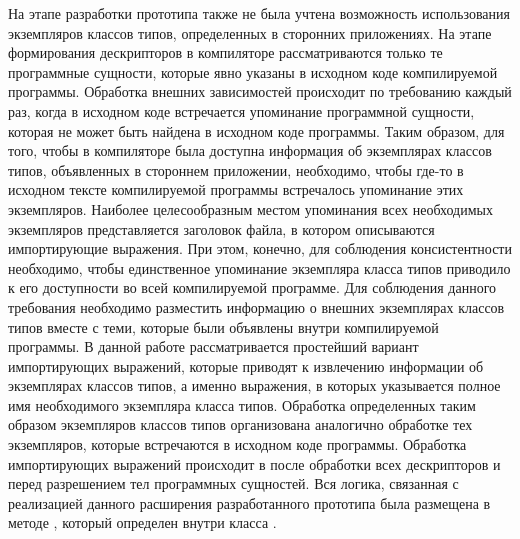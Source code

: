 На этапе разработки прототипа также не была учтена возможность использования экземпляров классов типов, определенных в сторонних приложениях. На этапе формирования дескрипторов в компиляторе рассматриваются только те программные сущности, которые явно указаны в исходном коде компилируемой программы. Обработка внешних зависимостей происходит по требованию каждый раз, когда в исходном коде встречается упоминание программной сущности, которая не может быть найдена в исходном коде программы. Таким образом, для того, чтобы в компиляторе была доступна информация об экземплярах классов типов, объявленных в стороннем приложении, необходимо, чтобы где-то в исходном тексте компилируемой программы встречалось упоминание этих экземпляров. Наиболее целесообразным местом упоминания всех необходимых экземпляров представляется заголовок файла, в котором описываются импортирующие выражения. При этом, конечно, для соблюдения консистентности необходимо, чтобы единственное упоминание экземпляра класса типов приводило к его доступности во всей компилируемой программе. Для соблюдения данного требования необходимо разместить информацию о внешних экземплярах классов типов вместе с теми, которые были объявлены внутри компилируемой программы. В данной работе рассматривается простейший вариант импортирующих выражений, которые приводят к извлечению информации об экземплярах классов типов, а именно выражения, в которых указывается полное имя необходимого экземпляра класса типов. Обработка определенных таким образом экземпляров классов типов организована аналогично обработке тех экземпляров, которые встречаются в исходном коде программы. Обработка импортирующих выражений происходит в  после обработки всех дескрипторов и перед разрешением тел программных сущностей. Вся логика, связанная с реализацией данного расширения разработанного прототипа была размещена в методе , который определен внутри класса .    


